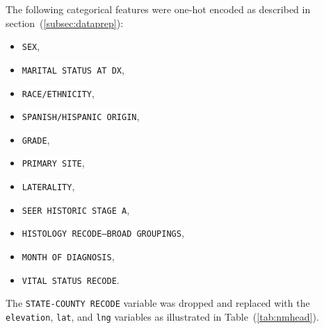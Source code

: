 \documentclass[a4paper,11pt]{article}
\newcommand{\codewhite}[1]{\colorbox{white}{\texttt{#1}}}
\begin{document}
The following categorical features were one-hot encoded as described in 
section~(\ref{subsec:dataprep}):

\begin{itemize}[noitemsep]
\item \codewhite{SEX},
\item  \codewhite{MARITAL STATUS AT DX},
\item \codewhite{RACE/ETHNICITY},
\item \codewhite{SPANISH/HISPANIC ORIGIN},
\item \codewhite{GRADE},
\item \codewhite{PRIMARY SITE},
\item \codewhite{LATERALITY},
\item \codewhite{SEER HISTORIC STAGE A},
\item \codewhite{HISTOLOGY RECODE--BROAD GROUPINGS},
\item \codewhite{MONTH OF DIAGNOSIS},
\item  \codewhite{VITAL STATUS RECODE}.
\end{itemize}
The \codewhite{STATE-COUNTY RECODE} variable was dropped and replaced with the \codewhite{elevation}, \codewhite{lat}, and \codewhite{lng} variables as illustrated in Table~(\ref{tab:nmhead}).





\end{document}
